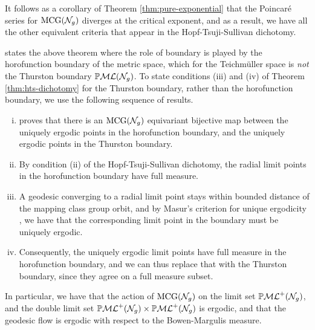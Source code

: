 It follows as a corollary of Theorem \ref{thm:pure-exponential} that the Poincaré series for $\mathrm{MCG}(\mathcal{N}_g)$ diverges at the critical exponent, and as a result, we have all the other equivalent criteria that appear in the Hopf-Tsuji-Sullivan dichotomy.

\begin{remark}
  \textcite{coulon2024ergodicity} states the above theorem where the role of boundary is played by the horofunction boundary of the metric space, which for the Teichmüller space is \emph{not} the Thurston boundary $\mathbb{P}\mathcal{ML}(\mathcal{N}_g)$.
  To state conditions (iii) and (iv) of Theorem \ref{thm:hts-dichotomy} for the Thurston boundary, rather than the horofunction boundary, we use the following sequence of results.
  \begin{enumerate}[(i)]
  \item \textcite{miyachi2008teichmuller} proves that there is an $\mathrm{MCG}(\mathcal{N}_g)$ equivariant bijective map between the uniquely ergodic points in the horofunction boundary, and the uniquely ergodic points in the Thurston boundary.
  \item By condition (ii) of the Hopf-Tsuji-Sullivan dichotomy, the radial limit points in the horofunction boundary have full measure.
  \item A geodesic converging to a radial limit point stays within bounded distance of the mapping class group orbit, and by Masur's criterion for unique ergodicity \cite{masur1982interval}, we have that the corresponding limit point in the boundary must be uniquely ergodic.
  \item Consequently, the uniquely ergodic limit points have full measure in the horofunction boundary, and we can thus replace that with the Thurston boundary, since they agree on a full measure subset.
  \end{enumerate}
\end{remark}

In particular, we have that the action of $\mathrm{MCG}(\mathcal{N}_g)$ on the limit set $\mathbb{P}\mathcal{ML}^+(\mathcal{N}_g)$, and the double limit set $\mathbb{P}\mathcal{ML}^+(\mathcal{N}_g) \times \mathbb{P}\mathcal{ML}^+(\mathcal{N}_g)$ is ergodic, and that the geodesic flow is ergodic with respect to the Bowen-Margulis measure.

